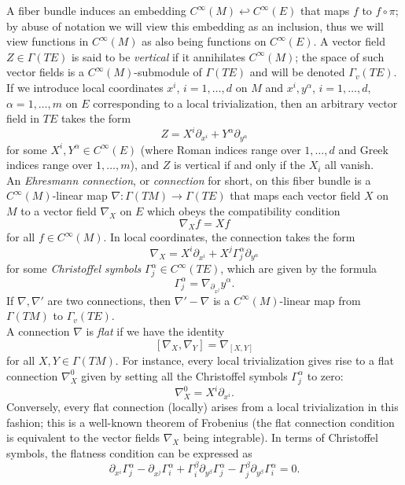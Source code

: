 \documentclass{article}
\numberwithin{equation}{section}
\theoremstyle{plain}
\begin{document}
A fiber bundle induces an embedding $C^\infty(M) \hookleftarrow C^\infty(E)$ that maps $f$ to $f \circ \pi$; by abuse of notation we will view this embedding as an inclusion, thus we will view functions in $C^\infty(M)$ as also being functions on $C^\infty(E)$.  A vector field $Z \in \Gamma(TE)$ is said to be \emph{vertical} if it annihilates $C^\infty(M)$; the space of such vector fields is a $C^\infty(M)$-submodule of $\Gamma(TE)$ and will be denoted $\Gamma_v(TE)$.  If we introduce local coordinates $x^i$, $i=1,\dots,d$ on $M$ and $x^i, y^\alpha$, $i=1,\dots,d$, $\alpha=1,\dots,m$ on $E$ corresponding to a local trivialization, then an arbitrary vector field in $TE$ takes the form
$$ Z = X^i \partial_{x^i} + Y^\alpha \partial_{y^\alpha}$$
for some $X^i, Y^\alpha \in C^\infty(E)$ (where Roman indices range over $1,\dots,d$ and Greek indices range over $1,\dots,m$), and $Z$ is vertical if and only if the $X_i$ all vanish.\\

An \emph{Ehresmann connection}, or \emph{connection} for short, on this fiber bundle is a $C^\infty(M)$-linear map $\nabla \colon \Gamma(TM) \to \Gamma(TE)$ that maps each vector field $X$ on $M$ to a vector field $\nabla_X$ on $E$ which obeys the compatibility condition
$$ \nabla_X f = X f $$
for all $f \in C^\infty(M)$.  In local coordinates, the connection takes the form
$$ \nabla_X = X^i \partial_{x^i} + X^j \Gamma^\alpha_j \partial_{y^\alpha}$$
for some \emph{Christoffel symbols} $\Gamma^\alpha_j \in C^\infty(TE)$, which are given by the formula
$$ \Gamma^\alpha_j = \nabla_{\partial_{x^j}} y^\alpha.$$
If $\nabla,\nabla'$ are two connections, then $\nabla'-\nabla$ is a $C^\infty(M)$-linear map from $\Gamma(TM)$ to $\Gamma_v(TE)$.\\

A connection $\nabla$ is \emph{flat} if we have the identity
\begin{equation}\label{flat}
    [\nabla_X, \nabla_Y] = \nabla_{[X,Y]}
\end{equation}
for all $X,Y \in \Gamma (TM)$.  For instance, every local trivialization gives rise to a flat connection $\nabla^0_X$ given by setting all the Christoffel symbols $\Gamma^\alpha_j$ to zero:
$$ \nabla^0_X = X^i \partial_{x^i}.$$
Conversely, every flat connection (locally) arises from a local trivialization in this fashion; this is a well-known theorem of Frobenius (the flat connection condition is equivalent to the vector fields $\nabla_X$ being integrable).  In terms of Christoffel symbols, the flatness condition can be expressed as
$$ \partial_{x^i} \Gamma^\alpha_j - \partial_{x^j} \Gamma^\alpha_i + \Gamma^\beta_i \partial_{y^\beta} \Gamma^\alpha_j - \Gamma^\beta_j \partial_{y^\beta} \Gamma^\alpha_i = 0.$$
\end{document}
